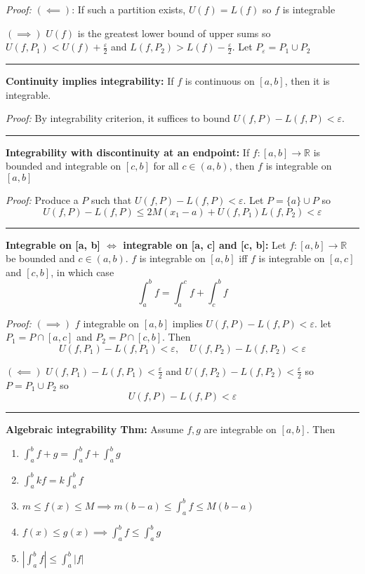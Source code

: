 \documentclass[12pt]{article}
\newcommand{\R}{\mathbb{R}}
\newcommand{\abs}[1]{\left\vert #1 \right\vert}
\newcommand{\ep}{\varepsilon}
\renewcommand{\hline}{\vspace*{10pt} \hrule \vspace*{10pt}}
\begin{document}
        \emph{Proof:} $(\impliedby)$: If such a partition exists, $U(f) = L(f)$ so $f$ is integrable 

        $(\implies)$ $U(f)$ is the greatest lower bound of upper sums so $U(f, P_1) < U(f) + \frac{\ep}{2}$ and $L(f, P_2) > L(f) - \frac{\ep}{2}$. Let $P_{\ep} = P_1 \cup P_2$ 

    \hline 

    \textbf{Continuity implies integrability:} If $f$ is continuous on $[a, b]$, then it is integrable. 

        \emph{Proof:} By integrability criterion, it suffices to bound $U(f, P) - L(f, P) < \ep$. 
    \hline 

    \textbf{Integrability with discontinuity at an endpoint:} If $f: [a, b] \to \R$ is bounded and integrable on $[c, b]$ for all $c \in (a, b)$, then $f$ is integrable on $[a, b]$

        \emph{Proof:} Produce a $P$ such that $U(f, P) - L(f, P) < \ep$. Let $P = \{a\} \cup P$ so 
        \[U(f, P) - L(f, P) \leq 2M(x_1 - a) + U(f, P_1)L(f, P_2) < \ep\]

    \hline

    \textbf{Integrable on [a, b] $\iff$ integrable on [a, c] and [c, b]:} Let $f: [a, b] \to \R$ be bounded and $c \in (a, b)$. $f$ is integrable on $[a, b]$ iff $f$ is integrable on $[a, c]$ and $[c, b]$, in which case 
    \[\int_a^b f = \int_a^c f + \int_c^b f\]

        \emph{Proof:} $(\implies)$ $f$ integrable on $[a, b]$ implies $U(f, P) - L(f, P) < \ep$. let $P_1 = P \cap [a, c]$ and $P_2 = P \cap [c, b]$. Then 
        \[U(f, P_1) - L(f, P_1) < \ep, \quad U(f, P_2) - L(f, P_2) < \ep\]

        $(\impliedby)$ $U(f, P_1) - L(f, P_1) < \frac{\ep}{2}$ and $U(f, P_2) - L(f, P_2) < \frac{\ep}{2}$ so $P = P_1 \cup P_2$ so 
        \[U(f, P) - L(f, P) < \ep\]

    \hline

    \textbf{Algebraic integrability Thm:} Assume $f, g$ are integrable on $[a, b]$. Then
    \begin{enumerate}
        \item $\int_a^b f + g = \int_a^b f + \int_a^b g$
        \item $\int_a^b kf = k\int_a^b f$
        \item $m \leq f(x) \leq M \implies m(b-a) \leq \int_a^b f\leq M(b-a)$
        \item $f(x) \leq g(x) \implies \int_a^b f \leq \int_a^b g$
        \item $\abs{\int_a^b f} \leq \int_a^b \abs{f}$
    \end{enumerate}
\end{document}
